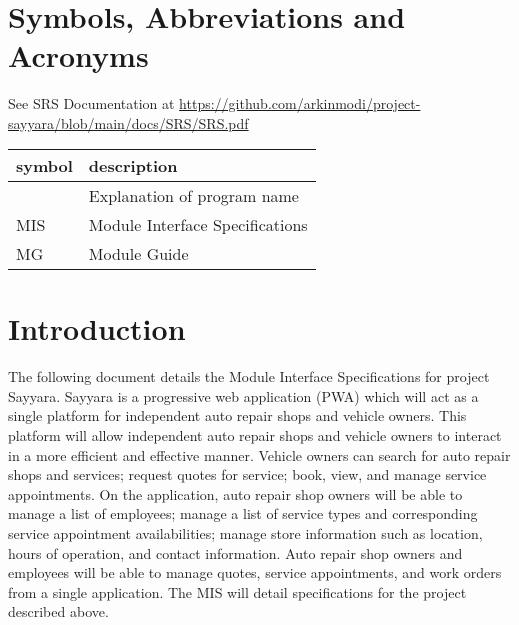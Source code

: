 \documentclass[12pt, titlepage]{article}
\begin{document}
~\newpage

\section{Symbols, Abbreviations and Acronyms}

See SRS Documentation at
\url{https://github.com/arkinmodi/project-sayyara/blob/main/docs/SRS/SRS.pdf}


\begin{tabular}{l l}
	\toprule
	\textbf{symbol} & \textbf{description}            \\
	\midrule
	\progname       & Explanation of program name     \\
	MIS             & Module Interface Specifications \\
	MG              & Module Guide                    \\
	\bottomrule
\end{tabular}

\newpage

\tableofcontents

\newpage

\listoftables

\listoffigures

\newpage


\section{Introduction}

The following document details the Module Interface Specifications for project Sayyara. Sayyara is
a progressive web application (PWA) which will act as a single platform for independent auto repair
shops and vehicle owners. This platform will allow independent auto repair shops and vehicle owners
to interact in a more efficient and effective manner. Vehicle owners can search for auto repair
shops and services; request quotes for service; book, view, and manage service appointments. On the
application, auto repair shop owners will be able to manage a list of employees; manage a list of
service types and corresponding service appointment availabilities; manage store information such
as location, hours of operation, and contact information. Auto repair shop owners and employees
will be able to manage quotes, service appointments, and work orders from a single application. The
MIS will detail specifications for the project described above.
\end{document}
